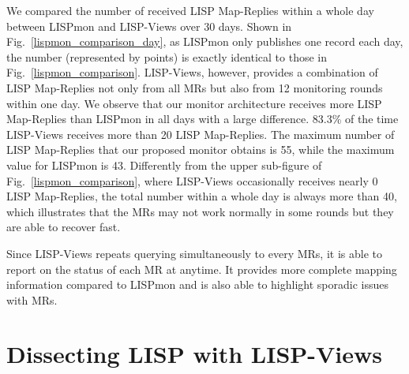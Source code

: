 We compared the number of received LISP Map-Replies within a whole day between LISPmon and LISP-Views over 30 days. Shown in Fig.~\ref{lispmon_comparison_day}, as LISPmon only publishes one record each day, the number (represented by points) is exactly identical to those in Fig.~\ref{lispmon_comparison}. LISP-Views, however, provides a combination of LISP Map-Replies not only from all MRs but also from 12 monitoring rounds within one day. We observe that our monitor architecture receives more LISP Map-Replies than LISPmon in all days with a large difference. 83.3\% of the time LISP-Views receives more than 20 LISP Map-Replies. The maximum number of LISP Map-Replies that our proposed monitor obtains is 55, while the maximum value for LISPmon is 43. Differently from the upper sub-figure of Fig.~\ref{lispmon_comparison}, where LISP-Views occasionally receives nearly 0 LISP Map-Replies, the total number within a whole day is always more than 40, which illustrates that the MRs may not work normally in some rounds but they are able to recover fast. 

Since LISP-Views repeats querying simultaneously to every MRs, it is able to report on the status of each MR at anytime. It provides more complete mapping information compared to LISPmon and is also able to highlight sporadic issues with MRs.


\section{Dissecting LISP with LISP-Views}
\label{sec:lispviews_results}

